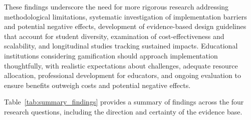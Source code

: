 \documentclass[a4paper,fleqn]{cas-sc}
\begin{document}
These findings underscore the need for more rigorous research addressing methodological limitations, systematic investigation of implementation barriers and potential negative effects, development of evidence-based design guidelines that account for student diversity, examination of cost-effectiveness and scalability, and longitudinal studies tracking sustained impacts. Educational institutions considering gamification should approach implementation thoughtfully, with realistic expectations about challenges, adequate resource allocation, professional development for educators, and ongoing evaluation to ensure benefits outweigh costs and potential negative effects.

Table~\ref{tab:summary_findings} provides a summary of findings across the four research questions, including the direction and certainty of the evidence base.
\end{document}

